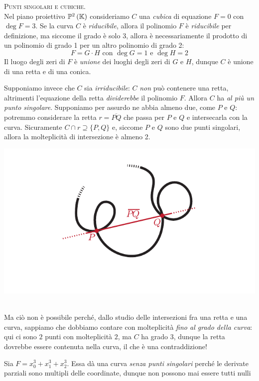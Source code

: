 \begin{observe}\textsc{Punti singolari e cubiche.}\\
	Nel piano proiettivo $\proj[2]{\kamp}$ consideriamo $C$ una \textit{cubica} di equazione $F=0$ con $\deg F=3$. Se la curva $C$ è \textit{riducibile}, allora il polinomio $F$ è \textit{riducibile} per definizione, ma siccome il grado è solo 3, allora è necessariamente il prodotto di un polinomio di grado 1 per un altro polinomio di grado 2:
	\begin{equation*}
		F=G\cdot H\text{ con }\deg G=1\text{ e }\deg H=2
	\end{equation*}
	Il luogo degli zeri di $F$ è \textit{unione} dei luoghi degli zeri di $G$ e $H$, dunque $C$ è unione di una retta e di una conica.\\
	\hspace{-1mm}
	\begin{minipage}{0.75\textwidth}
	\vspace{2mm}
	Supponiamo invece che $C$ sia \textit{irriducibile}: $C$ \textit{non} può contenere una retta, altrimenti l'equazione della retta \textit{dividerebbe} il polinomio $F$. Allora $C$ ha \textit{al più un punto singolare}.
	Supponiamo per assurdo ne abbia almeno due, come $P$ e $Q$: potremmo considerare la retta $r=\overline{PQ}$ che passa per $P$ e $Q$ e intersecarla con la curva. Sicuramente $C\cap r\supseteq \{P,Q\}$ e, siccome $P$ e $Q$ sono due punti singolari, allora la molteplicità di intersezione è almeno 2.
	\end{minipage}
	\hspace{-12mm}
	\begin{minipage}{0.24\textwidth}
		\includegraphics[trim=0cm 0cm 0cm 0cm,clip,scale=0.50]{images/planecurve5.pdf}
	\end{minipage}\\
	Ma ciò non è possibile perché, dallo studio delle intersezioni fra una retta e una curva, sappiamo che dobbiamo contare con molteplicità \textit{fino al grado della curva}: qui ci sono $2$ punti con molteplicità $2$, ma $C$ ha grado 3, dunque la retta dovrebbe essere contenuta nella curva, il che è una contraddizione!
\end{observe}
\begin{example}
	Sia $F=x_0^3+x_1^3+x_2^3$. Essa dà una curva \textit{senza punti singolari} perché le derivate parziali sono multipli delle coordinate, dunque non possono mai essere tutti nulli
\end{example}

